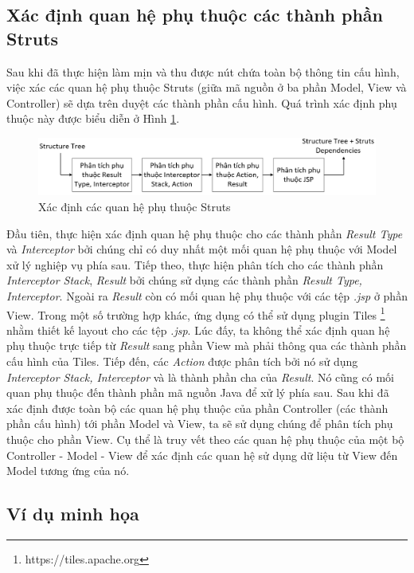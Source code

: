 \documentclass[12pt]{report}
\begin{document}
\subsection{Xác định quan hệ phụ thuộc các thành phần Struts}
Sau khi đã thực hiện làm mịn và thu được nút chứa toàn bộ thông tin cấu hình, việc xác các quan hệ phụ thuộc Struts (giữa mã nguồn ở ba phần Model, View và Controller) sẽ dựa trên duyệt các thành phần cấu hình. Quá trình xác định phụ thuộc này được biểu diễn ở Hình \ref{fig:struts-analyzer}.

\begin{figure}[h]
	\centering
	\includegraphics[scale=0.55]{struts-analyzer}
	\caption{Xác định các quan hệ phụ thuộc Struts}
	\label{fig:struts-analyzer}
\end{figure}

Đầu tiên, thực hiện xác định quan hệ phụ thuộc cho các thành phần \textit{Result Type} và \textit{Interceptor} bởi chúng chỉ có duy nhất một mối quan hệ phụ thuộc với Model xử lý nghiệp vụ phía sau. Tiếp theo, thực hiện phân tích cho các thành phần \textit{Interceptor Stack}, \textit{Result} bởi chúng sử dụng các thành phần \textit{Result Type, Interceptor}. Ngoài ra \textit{Result} còn có mối quan hệ phụ thuộc với các tệp \textit{.jsp} ở phần View. Trong một số trường hợp khác, ứng dụng có thể sử dụng plugin Tiles \footnote{https://tiles.apache.org} nhằm thiết kế layout cho các tệp \textit{.jsp}. Lúc đấy, ta không thể xác định quan hệ phụ thuộc trực tiếp từ \textit{Result} sang phần View mà phải thông qua các thành phần cấu hình của Tiles. Tiếp đến, các \textit{Action} được phân tích bởi nó sử dụng \textit{Interceptor Stack, Interceptor} và là thành phần cha của \textit{Result}. Nó cũng có mối quan phụ thuộc đến thành phần mã nguồn Java để xử lý phía sau. Sau khi đã xác định được toàn bộ các quan hệ phụ thuộc của phần Controller (các thành phần cấu hình) tới phần Model và View, ta sẽ sử dụng chúng để phân tích phụ thuộc cho phần View. Cụ thể là truy vết theo các quan hệ phụ thuộc của một bộ Controller - Model - View để xác định các quan hệ sử dụng dữ liệu từ View đến Model tương ứng của nó.

\subsection{Ví dụ minh họa}
\end{document}

